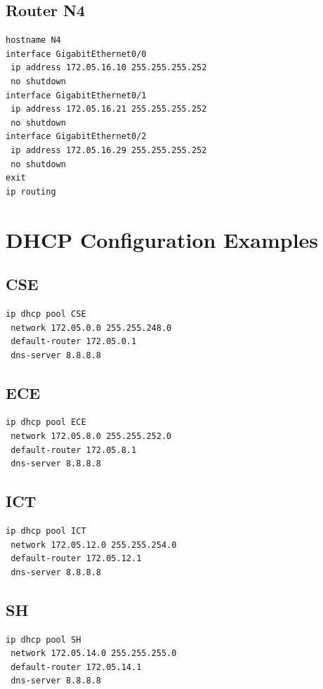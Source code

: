\documentclass[12pt]{article}
\begin{document}
\subsection{Router N4}
\begin{lstlisting}[basicstyle=\ttfamily\small, frame=single]
hostname N4
interface GigabitEthernet0/0
 ip address 172.05.16.10 255.255.255.252
 no shutdown
interface GigabitEthernet0/1
 ip address 172.05.16.21 255.255.255.252
 no shutdown
interface GigabitEthernet0/2
 ip address 172.05.16.29 255.255.255.252
 no shutdown
exit
ip routing
\end{lstlisting}
\newpage
\section{DHCP Configuration Examples}

\subsection{CSE}
\begin{lstlisting}[basicstyle=\ttfamily\small, frame=single]
ip dhcp pool CSE
 network 172.05.0.0 255.255.248.0
 default-router 172.05.0.1
 dns-server 8.8.8.8
\end{lstlisting}

\subsection{ECE}
\begin{lstlisting}[basicstyle=\ttfamily\small, frame=single]
ip dhcp pool ECE
 network 172.05.8.0 255.255.252.0
 default-router 172.05.8.1
 dns-server 8.8.8.8
\end{lstlisting}

\subsection{ICT}
\begin{lstlisting}[basicstyle=\ttfamily\small, frame=single]
ip dhcp pool ICT
 network 172.05.12.0 255.255.254.0
 default-router 172.05.12.1
 dns-server 8.8.8.8
\end{lstlisting}

\subsection{SH}
\begin{lstlisting}[basicstyle=\ttfamily\small, frame=single]
ip dhcp pool SH
 network 172.05.14.0 255.255.255.0
 default-router 172.05.14.1
 dns-server 8.8.8.8
\end{lstlisting}
\end{document}
